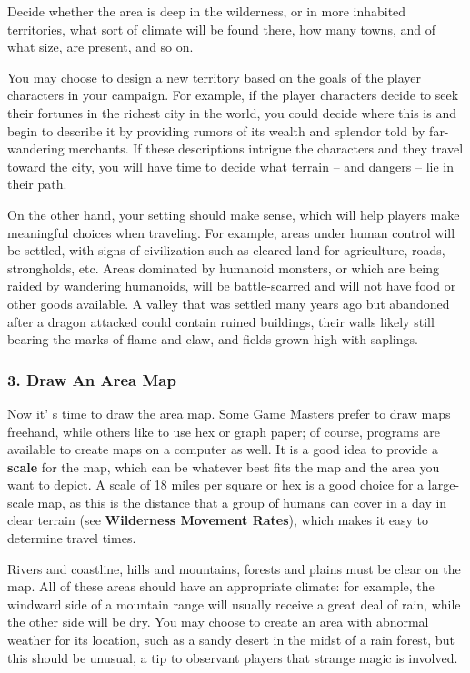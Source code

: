 \documentclass[a4paper,twoside,openany,10pt]{book}
\begin{document}
\begin{multicols}{2}
Decide whether the area is deep in the wilderness, or in more inhabited territories, what sort of climate will be found there, how many towns, and of what size, are present, and so on.

You may choose to design a new territory based on the goals of the player characters in your campaign. For example, if the player characters decide to seek their fortunes in the richest city in the world, you could decide where this is and begin to describe it by providing rumors of its wealth and splendor told by far-wandering merchants. If these descriptions intrigue the characters and they travel toward the city, you will have time to decide what terrain -- and dangers -- lie in their path.

On the other hand, your setting should make sense, which will help players make meaningful choices when traveling. For example, areas under human control will be settled, with signs of civilization such as cleared land for agriculture, roads, strongholds, etc. Areas dominated by humanoid monsters, or which are being raided by wandering humanoids, will be battle-scarred and will not have food or other goods available. A valley that was settled many years ago but abandoned after a dragon attacked could contain ruined buildings, their walls likely still bearing the marks of flame and claw, and fields grown high with saplings.

\subsubsection{3. Draw An Area Map}\label{draw-an-area-map}

Now it' s time to draw the area map. Some Game Masters prefer to draw maps freehand, while others like to use hex or graph paper; of course, programs are available to create maps on a computer as well. It is a good idea to provide a \textbf{scale} for the map, which can be whatever best fits the map and the area you want to depict. A scale of 18 miles per square or hex is a good choice for a large-scale map, as this is the distance that a group of humans can cover in a day in clear terrain (see \textbf{Wilderness Movement Rates}), which makes it easy to determine travel times.

Rivers and coastline, hills and mountains, forests and plains must be clear on the map. All of these areas should have an appropriate climate: for example, the windward side of a mountain range will usually receive a great deal of rain, while the other side will be dry. You may choose to create an area with abnormal weather for its location, such as a sandy desert in the midst of a rain forest, but this should be unusual, a tip to observant players that strange magic is involved.


\end{multicols}
\end{document}
